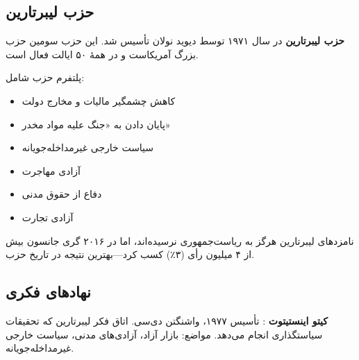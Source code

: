 \begin{center}
\end{center}

\subsection{حزب لیبرتارین}


\textbf{حزب لیبرتارین} در سال ۱۹۷۱ توسط دیوید نولان تأسیس شد. این حزب سومین حزب بزرگ آمریکاست و در همهٔ ۵۰ ایالت فعال است.

پلتفرم حزب شامل:
\begin{itemize}
    \item کاهش چشمگیر مالیات و مخارج دولت
    \item پایان دادن به «جنگ علیه مواد مخدر»
    \item سیاست خارجی غیرمداخله‌جویانه
    \item آزادی مهاجرت
    \item دفاع از حقوق مدنی
    \item آزادی تجارت
\end{itemize}

نامزدهای لیبرتارین هرگز به ریاست‌جمهوری نرسیده‌اند، اما در ۲۰۱۶ گری جانسون بیش از ۴ میلیون رأی (۳٪) کسب کرد—بهترین نتیجه در تاریخ حزب.

\subsection{نهادهای فکری}


\textbf{کیتو اینستیتوت} : تأسیس ۱۹۷۷، واشنگتن دی‌سی. اتاق فکر لیبرتارین که تحقیقات سیاستگذاری انجام می‌دهد. مواضع: بازار آزاد، آزادی‌های مدنی، سیاست خارجی غیرمداخله‌جویانه.

